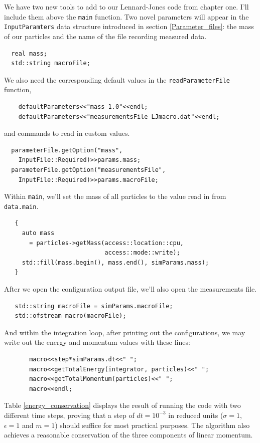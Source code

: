 We have two new tools to add to our Lennard-Jones code from chapter one. I'll 
include them above the \texttt{main} function. Two novel parameters will appear 
in the \texttt{InputParamters} data structure introduced in section 
\ref{Parameter_files}: the mass of our particles and the name of the file 
recording measured data.
\begin{lstlisting}
  real mass;
  std::string macroFile;
\end{lstlisting}
We also need the corresponding default values in the \texttt{readParameterFile} 
function,
\begin{lstlisting}
    defaultParameters<<"mass 1.0"<<endl;
    defaultParameters<<"measurementsFile LJmacro.dat"<<endl;
\end{lstlisting}
and commands to read in custom values.
\begin{lstlisting}
  parameterFile.getOption("mass",
    InputFile::Required)>>params.mass;
  parameterFile.getOption("measurementsFile",
    InputFile::Required)>>params.macroFile;
\end{lstlisting}
Within \texttt{main}, we'll set the mass of all particles to the value read in 
from \texttt{data.main}.
\begin{lstlisting}
   {
     auto mass
       = particles->getMass(access::location::cpu,
                            access::mode::write);
     std::fill(mass.begin(), mass.end(), simParams.mass);
   }
\end{lstlisting}
After we open the configuration output file, we'll also open the measurements 
file.
\begin{lstlisting}
   std::string macroFile = simParams.macroFile;
   std::ofstream macro(macroFile);
\end{lstlisting}
And within the integration loop, after printing out the configurations, we may 
write out the energy and momentum values with these lines:
\begin{lstlisting}
       macro<<step*simParams.dt<<" ";
       macro<<getTotalEnergy(integrator, particles)<<" ";
       macro<<getTotalMomentum(particles)<<" ";
       macro<<endl;
\end{lstlisting}

Table \ref{energy_conservation} displays the result of running the code with two 
different time steps, proving that a step of $dt = 10^{-3}$ in reduced units 
($\sigma = 1$, $\epsilon = 1$ and $m = 1$) should suffice for most practical 
purposes. The algorithm also achieves a reasonable conservation of the three 
components of linear momentum.

